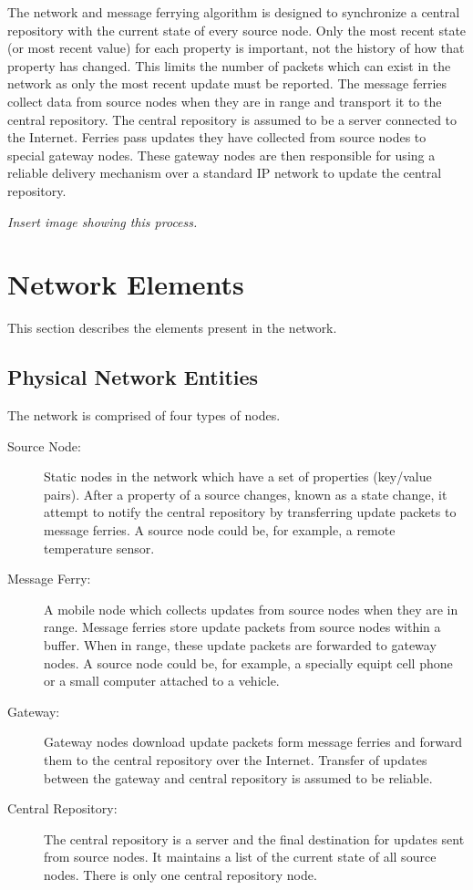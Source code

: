 The network and message ferrying algorithm is designed to synchronize a central repository with the current state of every source node.
Only the most recent state (or most recent value) for each property is important, not the history of how that property has changed.
This limits the number of packets which can exist in the network as only the most recent update must be reported.
The message ferries collect data from source nodes when they are in range and transport it to the central repository.
The central repository is assumed to be a server connected to the Internet.
Ferries pass updates they have collected from source nodes to special gateway nodes.
These gateway nodes are then responsible for using a reliable delivery mechanism over a standard IP network to update the central repository.

\emph{Insert image showing this process.}

\section{Network Elements}

This section describes the elements present in the network.

\subsection{Physical Network Entities}

The network is comprised of four types of nodes.

\begin{description}
\item[Source Node: ] 
Static nodes in the network which have a set of properties (key/value pairs).
After a property of a source changes, known as a state change, it attempt to notify the central repository by transferring update packets to message ferries.
A source node could be, for example, a remote temperature sensor.
\item[Message Ferry: ] 
A mobile node which collects updates from source nodes when they are in range.
Message ferries store update packets from source nodes within a buffer. 
When in range, these update packets are forwarded to gateway nodes.
A source node could be, for example, a specially equipt cell phone or a small computer attached to a vehicle. 
\item[Gateway: ]
Gateway nodes download update packets form message ferries and forward them to the central repository over the Internet.
Transfer of updates between the gateway and central repository is assumed to be reliable. 
\item[Central Repository: ] 
The central repository is a server and the final destination for updates sent from source nodes.
It maintains a list of the current state of all source nodes.
There is only one central repository node.
\end{description}

